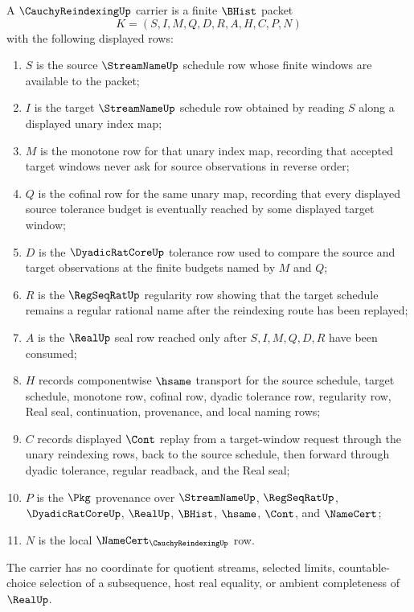 \begin{definition}
\label{def:cauchy-reindexing-carrier}
A $\CauchyReindexingUp$ carrier is a finite $\BHist$ packet
$$
K=(S,I,M,Q,D,R,A,H,C,P,N)
$$
with the following displayed rows:
\begin{enumerate}
\item $S$ is the source $\StreamNameUp$ schedule row whose finite windows are available to the packet;
\item $I$ is the target $\StreamNameUp$ schedule row obtained by reading $S$ along a displayed unary index map;
\item $M$ is the monotone row for that unary index map, recording that accepted target windows never ask for source observations in reverse order;
\item $Q$ is the cofinal row for the same unary map, recording that every displayed source tolerance budget is eventually reached by some displayed target window;
\item $D$ is the $\DyadicRatCoreUp$ tolerance row used to compare the source and target observations at the finite budgets named by $M$ and $Q$;
\item $R$ is the $\RegSeqRatUp$ regularity row showing that the target schedule remains a regular rational name after the reindexing route has been replayed;
\item $A$ is the $\RealUp$ seal row reached only after $S,I,M,Q,D,R$ have been consumed;
\item $H$ records componentwise $\hsame$ transport for the source schedule, target schedule, monotone row, cofinal row, dyadic tolerance row, regularity row, Real seal, continuation, provenance, and local naming rows;
\item $C$ records displayed $\Cont$ replay from a target-window request through the unary reindexing rows, back to the source schedule, then forward through dyadic tolerance, regular readback, and the Real seal;
\item $P$ is the $\Pkg$ provenance over $\StreamNameUp$, $\RegSeqRatUp$, $\DyadicRatCoreUp$, $\RealUp$, $\BHist$, $\hsame$, $\Cont$, and $\NameCert$;
\item $N$ is the local $\NameCert_{\CauchyReindexingUp}$ row.
\end{enumerate}
The carrier has no coordinate for quotient streams, selected limits, countable-choice selection of a subsequence, host real equality, or ambient completeness of $\RealUp$.
\end{definition}

